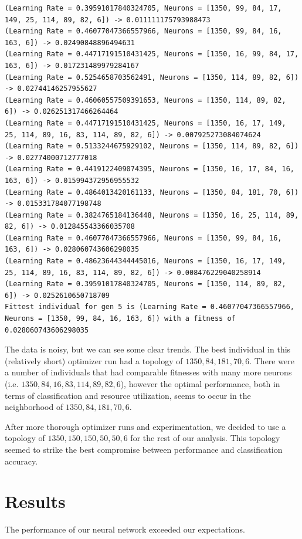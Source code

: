 \documentclass{report}
\begin{document}
\begin{verbatim}
(Learning Rate = 0.39591017840324705, Neurons = [1350, 99, 84, 17, 149, 25, 114, 89, 82, 6]) -> 0.011111175793988473
(Learning Rate = 0.46077047366557966, Neurons = [1350, 99, 84, 16, 163, 6]) -> 0.02490848896494631
(Learning Rate = 0.44717191510431425, Neurons = [1350, 16, 99, 84, 17, 163, 6]) -> 0.017231489979284167
(Learning Rate = 0.5254658703562491, Neurons = [1350, 114, 89, 82, 6]) -> 0.02744146257955627
(Learning Rate = 0.46060557509391653, Neurons = [1350, 114, 89, 82, 6]) -> 0.026251317466264464
(Learning Rate = 0.44717191510431425, Neurons = [1350, 16, 17, 149, 25, 114, 89, 16, 83, 114, 89, 82, 6]) -> 0.007925273084074624
(Learning Rate = 0.5133244675929102, Neurons = [1350, 114, 89, 82, 6]) -> 0.02774000712777018
(Learning Rate = 0.4419122409074395, Neurons = [1350, 16, 17, 84, 16, 163, 6]) -> 0.015994372956955532
(Learning Rate = 0.4864013420161133, Neurons = [1350, 84, 181, 70, 6]) -> 0.015331784077198748
(Learning Rate = 0.3824765184136448, Neurons = [1350, 16, 25, 114, 89, 82, 6]) -> 0.012845543366035708
(Learning Rate = 0.46077047366557966, Neurons = [1350, 99, 84, 16, 163, 6]) -> 0.028060743606298035
(Learning Rate = 0.48623644344445016, Neurons = [1350, 16, 17, 149, 25, 114, 89, 16, 83, 114, 89, 82, 6]) -> 0.008476229040258914
(Learning Rate = 0.39591017840324705, Neurons = [1350, 114, 89, 82, 6]) -> 0.0252610650718709
Fittest individual for gen 5 is (Learning Rate = 0.46077047366557966, Neurons = [1350, 99, 84, 16, 163, 6]) with a fitness of 0.028060743606298035
\end{verbatim}
The data is noisy, but we can see some clear trends. The best individual in this (relatively short) optimizer run had a topology of $1350, 84, 181, 70, 6$. There were a number of individuals that had comparable fitnesses with many more neurons (i.e. $1350, 84, 16, 83, 114, 89, 82, 6$), however the optimal performance, both in terms of classification and resource utilization, seems to occur in the neighborhood of $1350, 84, 181, 70, 6$.

After more thorough optimizer runs and experimentation, we decided to use a topology of $1350, 150, 150, 50, 50, 6$ for the rest of our analysis. This topology seemed to strike the best compromise between performance and classification accuracy.

\chapter{Results}

The performance of our neural network exceeded our expectations.
\end{document}
